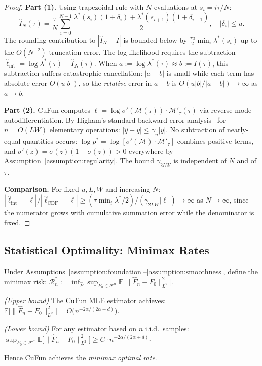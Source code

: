 \begin{proof}
\textbf{Part (1).}
Using trapezoidal rule with $N$ evaluations at $s_i = i\tau/N$:
\[
\hat{I}_N(\tau) = \frac{\tau}{N}\sum_{i=0}^{N-1}
\frac{\lambda^*(s_i)(1+\delta_i) + \lambda^*(s_{i+1})(1+\delta_{i+1})}{2},
\quad |\delta_i| \leq u.
\]
The rounding contribution to $|\hat{I}_N - I|$ is bounded below by
$\frac{\tau u}{2}\min_i\lambda^*(s_i)$ up to the $O(N^{-2})$ truncation error.
The log-likelihood requires the subtraction
$\hat{\ell}_{\mathrm{int}} = \log\lambda^*(\tau) - \hat{I}_N(\tau)$.
When $a := \log\lambda^*(\tau) \approx b := I(\tau)$, this subtraction suffers
catastrophic cancellation: $|a - b|$ is small while each term has absolute error
$O(u|b|)$, so the \emph{relative} error in $a - b$ is $O(u|b|/|a-b|) \to \infty$
as $a \to b$.

\textbf{Part (2).}
CuFun computes $\ell = \log\sigma'(\mathcal{M}(\tau))\cdot\mathcal{M}'_\tau(\tau)$
via reverse-mode autodifferentiation. By Higham's standard backward error
analysis~\cite{higham2002accuracy} for $n = O(LW)$ elementary operations:
$|\hat{y} - y| \leq \gamma_n|y|$. No subtraction of nearly-equal quantities occurs:
$\log p^* = \log[\sigma'(\mathcal{M})\cdot\mathcal{M}'_\tau]$ combines positive terms,
and $\sigma'(z) = \sigma(z)(1-\sigma(z)) > 0$ everywhere by
Assumption~\ref{assumption:regularity}. The bound $\gamma_{2LW}$ is independent of
$N$ and of $\tau$.

\textbf{Comparison.}
For fixed $u, L, W$ and increasing $N$:
$|\hat{\ell}_{\mathrm{int}} - \ell| / |\hat{\ell}_{\mathrm{CDF}} - \ell|
\geq (\tau\min_i\lambda^*/2) / (\gamma_{2LW}|\ell|) \to \infty$ as $N\to\infty$,
since the numerator grows with cumulative summation error while the denominator
is fixed.
\end{proof}

\subsection{Statistical Optimality: Minimax Rates}

\begin{theorem}
\label{thm:consistency_rate}
Under Assumptions~\ref{assumption:foundation}--\ref{assumption:smoothness},
define the minimax risk:
$\mathcal{R}_n^* := \inf_{\hat{F}} \sup_{F_0 \in \mathcal{F}^\alpha}
\mathbb{E}\bigl[\|\hat{F}_n - F_0\|_{L^2}^2\bigr]$.

\emph{(Upper bound)} The CuFun MLE estimator achieves:
$\mathbb{E}\bigl[\|\hat{F}_n - F_0\|_{L^2}^2\bigr] = O\!\bigl(n^{-2\alpha/(2\alpha+d)}\bigr)$.

\emph{(Lower bound)} For any estimator based on $n$ i.i.d.\ samples:
$\sup_{F_0 \in \mathcal{F}^\alpha}\mathbb{E}\bigl[\|\hat{F}_n - F_0\|_{L^2}^2\bigr]
\geq C\cdot n^{-2\alpha/(2\alpha+d)}$.

Hence CuFun achieves the \emph{minimax optimal rate}.
\end{theorem}

